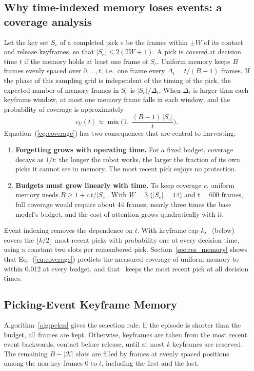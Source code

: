 \subsection{Why time-indexed memory loses events: a coverage analysis}
\label{sec:coverage}
Let the key set $S_e$ of a completed pick $e$ be the frames within $\pm W$ of its contact and release keyframes, so that $|S_e| \le 2(2W+1)$. A pick is \emph{covered} at decision time $t$ if the memory holds at least one frame of $S_e$. Uniform memory keeps $B$ frames evenly spaced over $0,\dots,t$, i.e.\ one frame every $\Delta_t = t/(B-1)$ frames. If the phase of this sampling grid is independent of the timing of the pick, the expected number of memory frames in $S_e$ is $|S_e|/\Delta_t$. When $\Delta_t$ is larger than each keyframe window, at most one memory frame falls in each window, and the probability of coverage is approximately
\begin{equation}
c_U(t) \approx \min\!\Big(1,\; \frac{(B-1)\,|S_e|}{t}\Big).
\label{eq:coverage}
\end{equation}
Equation~(\ref{eq:coverage}) has two consequences that are central to harvesting.
\begin{enumerate}
\item \textbf{Forgetting grows with operating time.} For a fixed budget, coverage decays as $1/t$: the longer the robot works, the larger the fraction of its own picks it cannot see in memory. The most recent pick enjoys no protection.
\item \textbf{Budgets must grow linearly with time.} To keep coverage $c$, uniform memory needs $B \ge 1 + c\,t/|S_e|$. With $W=3$ ($|S_e|=14$) and $t=600$ frames, full coverage would require about 44 frames, nearly three times the base model's budget, and the cost of attention grows quadratically with it.
\end{enumerate}
Event indexing removes the dependence on $t$. With keyframe cap $k$, \pekm\ (below) covers the $\lfloor k/2\rfloor$ most recent picks with probability one at every decision time, using a constant two slots per remembered pick. Section~\ref{sec:res_memory} shows that Eq.~(\ref{eq:coverage}) predicts the measured coverage of uniform memory to within 0.012 at every budget, and that \pekm\ keeps the most recent pick at all decision times.

\subsection{Picking-Event Keyframe Memory}
\label{sec:pekm}
Algorithm~\ref{alg:pekm} gives the selection rule. If the episode is shorter than the budget, all frames are kept. Otherwise, keyframes are taken from the most recent event backwards, contact before release, until at most $k$ keyframes are reserved. The remaining $B-|\mathcal{K}|$ slots are filled by frames at evenly spaced positions among the non-key frames 0 to $t$, including the first and the last.


